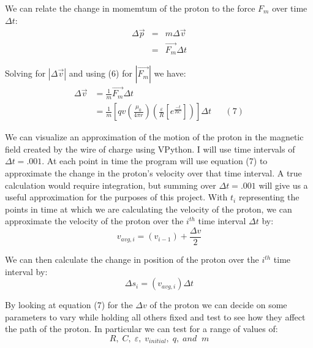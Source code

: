 \documentclass[11pt]{article}
\begin{document}
\vspace{.2in}

\noindent We can relate the change in momemtum of the proton to the force $F_m$ over time $\Delta t$:
\begin{eqnarray*}
\Delta\vec{p}&=&m\Delta\vec{v}\\&=&\vec{F_m}\Delta t
\end{eqnarray*}

\vspace{.2in}

\noindent Solving for $\left|\Delta\vec{v}\right|$ and using (6) for $\left|\vec{F_m}\right|$ we have:
\begin{align*}
\Delta\vec{v}&=\frac{1}{m}\vec{F_m}\Delta t\\&=\frac{1}{m}\left[qv\left(\frac{\mu_0}{4\pi r}\right)\left(\frac{\varepsilon}{R}\left[e^{\frac{-t}{RC}}\right]\right)\right]\Delta t &&(7)
\end{align*} 

\vspace{.2in}

\noindent We can visualize an approximation of the motion of the proton in the magnetic field created by the wire of charge using VPython. I will use time intervals of $\Delta t=.001$. At each point in time the program will use equation (7) to approximate the change in the proton's velocity over that time interval. A true calculation would require integration, but summing over $\Delta t=.001$ will give us a useful approximation for the purposes of this project. With $t_i$ representing the points in time at which we are calculating the velocity of the proton, we can approximate the velocity of the proton over the $i^{th}$ time interval $\Delta t$ by:
\[
v_{avg,i}=\left(v_{i-1}\right)+\frac{\Delta v}{2}
\]

\vspace{.2in}

\noindent We can then calculate the change in position of the proton over the $i^{th}$ time interval by:
\[
\Delta s_i=\left(v_{avg,i}\right)\Delta t
\]

\vspace{.2in}

\noindent By looking at equation (7) for the $\Delta v$ of the proton we can decide on some parameters to vary while holding all others fixed and test to see how they affect the path of the proton. In particular we can test for a range of values of:
\[
R,\;C,\;\varepsilon,\;v_{initial},\;q,\;and\;\;m
\]
\end{document}
